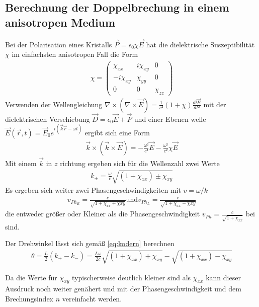 \subsection{Berechnung der Doppelbrechung in einem anisotropen Medium \cite{man_a} }
\label{sec:anisotrop}
Bei der Polarisation eines Kristalls $\vec{P} = \epsilon_0 \chi \vec{E}$ hat die dielektrische Suszeptibilität $\chi$
im einfachsten anisotropen Fall die Form
\begin{align}
	\chi = %
	\begin{pmatrix}
		\chi_{xx}     & i \chi_{xy} & 0         \\
		- i \chi_{xy} & \chi_{yy}   & 0         \\
		0             & 0           & \chi_{zz}
	\end{pmatrix}
	\label{eq:chi}
\end{align}
Verwenden der Wellengleichung $\nabla \times (\nabla \times \vec{E}) = \frac{1}{c²}(1 + \chi)\frac{d² \vec{E}}{d t²}$
mit der dielektrischen Verschiebung $\vec{D} = \epsilon_0 \vec{E}+ \vec{P}$ und einer Ebenen welle
$\vec{E}(\vec{r},t) = \vec{E}_0 e^{i(\vec{k}\vec{r} - \omega t)}$ ergibt sich eine Form
\begin{align}
	\vec{k} \times (\vec{k} \times \vec{E})= -\frac{\omega²}{c²} \vec{E}- \frac{\omega²}{c²}\chi \vec{E}
\end{align}
Mit einem $\vec{k}$ in $z$ richtung ergeben sich für die Wellenzahl zwei Werte
\begin{align}
	k_{\pm} = \frac{\omega}{c}\sqrt{(1+\chi_{xx})\pm \chi_{xy}}
\end{align}
Es ergeben sich weiter zwei Phasengeschwindigkeiten mit $v = \omega/ k$
\begin{align}
	v_{Ph_R} = \frac{c}{\sqrt{1+\chi_{xx}+\chi{xy}}} \text{und} v_{Ph_L} = \frac{c}{\sqrt{1+\chi_{xx}-\chi{xy}}}
\end{align}
die entweder größer oder Kleiner als die Phasengeschwindigkeit $v_{Ph}= \frac{c}{\sqrt{1+\chi_{xx}}}$ bei $	$ sind.

Der Drehwinkel lässt sich gemäß \eqref{eq:kodern} berechnen
\begin{align}
	\theta = \frac{L}{2}(k_+ -k_-) = \frac{L\omega}{2c}{ \sqrt{(1+ \chi_{xx} )+ \chi_{xy}} - \sqrt{(1+ \chi_{xx} )-\chi_{xy}} }
\end{align}

Da die Werte für $\chi_{xy}$ typischerweise deutlich kleiner sind als
$\chi_{xx}$ kann dieser Ausdruck noch weiter genähert und mit der Phasengeschwindigkeit und dem
Brechungsindex $n$ vereinfacht werden.

